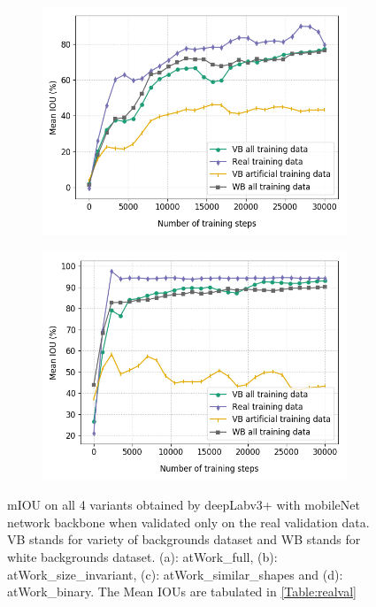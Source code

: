 \begin{figure}
\begin{subfigure}{.5\textwidth}
			\includegraphics[width=1\linewidth]{images/re_val_mob_shape}
			\caption{}
		\end{subfigure}
		\begin{subfigure}{.5\textwidth}
			\centering
			\includegraphics[width=1\linewidth]{images/re_val_mob_binary}
			\caption{}
		\end{subfigure}
		\caption{mIOU on all 4 variants obtained by deepLabv3+ with mobileNet network backbone when validated only on the real validation data. VB stands for variety of backgrounds dataset and WB stands for white backgrounds dataset. (a): atWork\_full, (b): atWork\_size\_invariant, (c): atWork\_similar\_shapes and (d): atWork\_binary. The Mean IOUs are tabulated in \ref{Table:realval}}
		\label{Fig:realvalmob}
	\end{figure}

